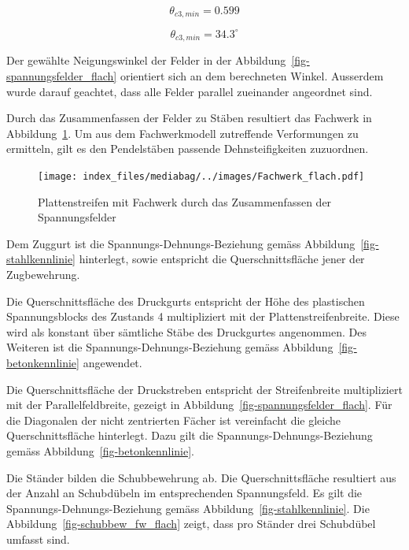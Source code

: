 \documentclass[
  12pt,
  letterpaper,
  egregdoesnotlikesansseriftitles]{scrreprt}
\begin{document}
\begin{equation}\theta_{c3,min} = 0.599\end{equation}

\begin{equation}\theta_{c3,min} = 34.3 ^\circ\end{equation}

Der gewählte Neigungswinkel der Felder in der
Abbildung~\ref{fig-spannungsfelder_flach} orientiert sich an dem
berechneten Winkel. Ausserdem wurde darauf geachtet, dass alle Felder
parallel zueinander angeordnet sind.

Durch das Zusammenfassen der Felder zu Stäben resultiert das Fachwerk in
Abbildung~\ref{fig-fachwerk_flach}. Um aus dem Fachwerkmodell
zutreffende Verformungen zu ermitteln, gilt es den Pendelstäben passende
Dehnsteifigkeiten zuzuordnen.

\begin{figure}[H]

{\centering \texttt{[image: index\_files/mediabag/../images/Fachwerk\_flach.pdf]}

}

\caption{\label{fig-fachwerk_flach}Plattenstreifen mit Fachwerk durch
das Zusammenfassen der Spannungsfelder}

\end{figure}

Dem Zuggurt ist die Spannungs-Dehnungs-Beziehung gemäss
Abbildung~\ref{fig-stahlkennlinie} hinterlegt, sowie entspricht die
Querschnittsfläche jener der Zugbewehrung.

Die Querschnittsfläche des Druckgurts entspricht der Höhe des
plastischen Spannungsblocks des Zustands 4 multipliziert mit der
Plattenstreifenbreite. Diese wird als konstant über sämtliche Stäbe des
Druckgurtes angenommen. Des Weiteren ist die
Spannungs-Dehnungs-Beziehung gemäss Abbildung~\ref{fig-betonkennlinie}
angewendet.

Die Querschnittsfläche der Druckstreben entspricht der Streifenbreite
multipliziert mit der Parallelfeldbreite, gezeigt in
Abbildung~\ref{fig-spannungsfelder_flach}. Für die Diagonalen der nicht
zentrierten Fächer ist vereinfacht die gleiche Querschnittsfläche
hinterlegt. Dazu gilt die Spannungs-Dehnungs-Beziehung gemäss
Abbildung~\ref{fig-betonkennlinie}.

Die Ständer bilden die Schubbewehrung ab. Die Querschnittsfläche
resultiert aus der Anzahl an Schubdübeln im entsprechenden
Spannungsfeld. Es gilt die Spannungs-Dehnungs-Beziehung gemäss
Abbildung~\ref{fig-stahlkennlinie}. Die
Abbildung~\ref{fig-schubbew_fw_flach} zeigt, dass pro Ständer drei
Schubdübel umfasst sind.
\end{document}
